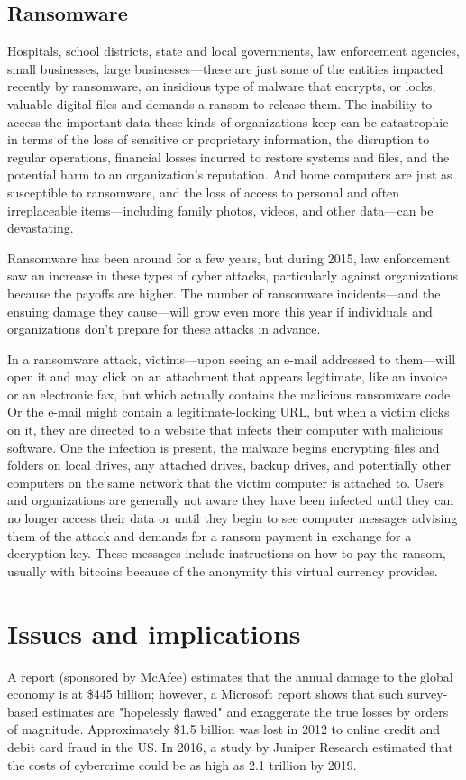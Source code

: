 \documentclass[12pt]{article}
\begin{document}
\subsection{Ransomware}
Hospitals, school districts, state and local governments, law enforcement agencies, small businesses, large businesses—these are just some of the entities impacted recently by ransomware, an insidious type of malware that encrypts, or locks, valuable digital files and demands a ransom to release them. The inability to access the important data these kinds of organizations keep can be catastrophic in terms of the loss of sensitive or proprietary information, the disruption to regular operations, financial losses incurred to restore systems and files, and the potential harm to an organization’s reputation. And home computers are just as susceptible to ransomware, and the loss of access to personal and often irreplaceable items—including family photos, videos, and other data—can be devastating.

Ransomware has been around for a few years, but during 2015, law enforcement saw an increase in these types of cyber attacks, particularly against organizations because the payoffs are higher. The number of ransomware incidents—and the ensuing damage they cause—will grow even more this year if individuals and organizations don’t prepare for these attacks in advance. 

In a ransomware attack, victims—upon seeing an e-mail addressed to them—will open it and may click on an attachment that appears legitimate, like an invoice or an electronic fax, but which actually contains the malicious ransomware code. Or the e-mail might contain a legitimate-looking URL, but when a victim clicks on it, they are directed to a website that infects their computer with malicious software. One the infection is present, the malware begins encrypting files and folders on local drives, any attached drives, backup drives, and potentially other computers on the same network that the victim computer is attached to. Users and organizations are generally not aware they have been infected until they can no longer access their data or until they begin to see computer messages advising them of the attack and demands for a ransom payment in exchange for a decryption key. These messages include instructions on how to pay the ransom, usually with bitcoins because of the anonymity this virtual currency provides.

\section{Issues and implications}
A report (sponsored by McAfee) estimates that the annual damage to the global economy is at \$445 billion; however, a Microsoft report shows that such survey-based estimates are "hopelessly flawed" and exaggerate the true losses by orders of magnitude. Approximately \$1.5 billion was lost in 2012 to online credit and debit card fraud in the US. In 2016, a study by Juniper Research estimated that the costs of cybercrime could be as high as 2.1 trillion by 2019.
\end{document}
